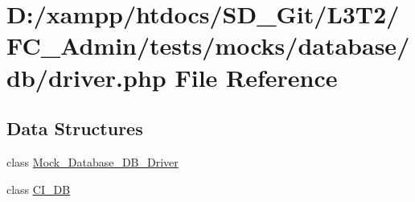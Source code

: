 \hypertarget{_admin_2tests_2mocks_2database_2db_2_driver_8php}{}\section{D\+:/xampp/htdocs/\+S\+D\+\_\+\+Git/\+L3\+T2/\+F\+C\+\_\+\+Admin/tests/mocks/database/db/driver.php File Reference}
\label{_admin_2tests_2mocks_2database_2db_2_driver_8php}
\subsection*{Data Structures}
\begin{DoxyCompactItemize}
\item 
class \hyperlink{class_mock___database___d_b___driver}{Mock\+\_\+\+Database\+\_\+\+D\+B\+\_\+\+Driver}
\item 
class \hyperlink{class_c_i___d_b}{C\+I\+\_\+\+D\+B}
\end{DoxyCompactItemize}
